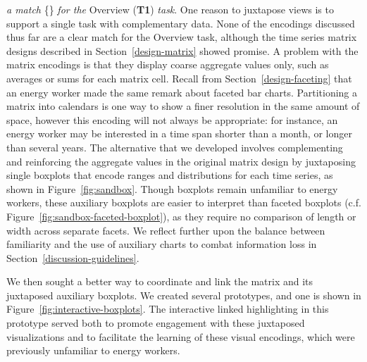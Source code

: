 \documentclass[journal]{vgtc}                %
\newcommand*\match{\textcolor{darkGreen}{\ding{52}}}
\newcommand{\bstart}[1]{\vspace{1mm} \noindent{\textbf{#1:}}}
\newcommand{\jn}[1]{\textcolor{darkGreen}{#1}}
\begin{document}
\bstart{Juxtaposed matrix and boxplots} {\it a match} \{\match\} {\it for the} Overview ({\bf T1}) {\it task}.
One reason to juxtapose views is to support a single task with complementary data.
None of the encodings discussed thus far are a clear match for the Overview task, although the time series matrix designs described in Section~\ref{design-matrix} showed promise.
A problem with the matrix encodings is that they display coarse aggregate values only, such as averages or sums for each matrix cell. 
Recall from Section~\ref{design-faceting} that an energy worker made the same remark about faceted bar charts.
Partitioning a matrix into calendars is one way to show a finer resolution in the same amount of space, however this encoding will not always be appropriate: for instance, an energy worker may be interested in a time span shorter than a month, or longer than several years.
The alternative that we developed involves complementing and reinforcing the aggregate values in the original matrix design by juxtaposing single boxplots that encode ranges and distributions for each time series, as shown in Figure~\ref{fig:sandbox}.
Though boxplots remain unfamiliar to energy workers, these auxiliary boxplots are easier to interpret than faceted boxplots (c.f. Figure~\ref{fig:sandbox-faceted-boxplot}), as they require no comparison of length or width across separate facets. 
We reflect further upon the balance between familiarity and the use of auxiliary charts to combat information loss in Section~\ref{discussion-guidelines}.

We then sought a better way to coordinate and link the matrix and its juxtaposed auxiliary boxplots. We created several prototypes, and one is shown in Figure~\ref{fig:interactive-boxplots}.
The interactive linked highlighting in this prototype served both to promote engagement with these juxtaposed visualizations and to facilitate the learning of these visual encodings, which were previously unfamiliar to energy workers.
\end{document}
